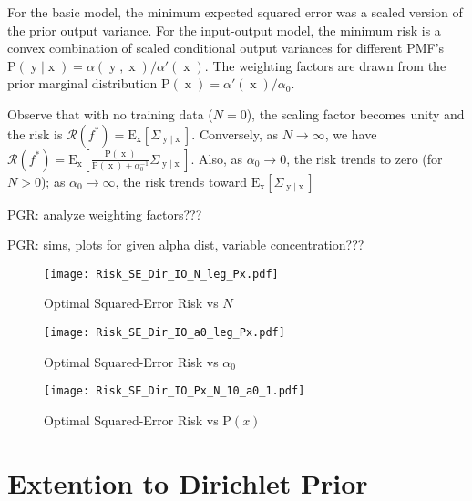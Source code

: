 \documentclass[12pt]{report}
\DeclareMathOperator{\xrm}{\mathrm{x}}
\DeclareMathOperator{\yrm}{\mathrm{y}}
\begin{document}
For the basic model, the minimum expected squared error was a scaled version of the prior output variance. For the input-output model, the minimum risk is a convex combination of scaled conditional output variances for different PMF's $\text{P}(\yrm | \xrm) = \alpha(\yrm,\xrm)/\alpha'(\xrm)$. The weighting factors are drawn from the prior marginal distribution $\text{P}(\xrm) = \alpha'(\xrm)/\alpha_0$.

Observe that with no training data ($N = 0$), the scaling factor becomes unity and the risk is $\mathcal{R}(f^*) = \text{E}_{\xrm} \left[ \Sigma_{\yrm | \xrm} \right]$. Conversely, as $N \to \infty$, we have $\mathcal{R}(f^*) = \text{E}_{\xrm} \left[ \frac{\text{P}(\xrm)}{\text{P}(\xrm) + \alpha_0^{-1}} \Sigma_{\yrm | \xrm} \right]$. Also, as $\alpha_0 \to 0$, the risk trends to zero (for $N > 0$); as $\alpha_0 \to \infty$, the risk trends toward $\text{E}_{\xrm} \left[ \Sigma_{\yrm | \xrm} \right]$



PGR: analyze weighting factors???

PGR: sims, plots for given alpha dist, variable concentration???


\begin{figure}
\centering
\texttt{[image: Risk\_SE\_Dir\_IO\_N\_leg\_Px.pdf]}
\caption{Optimal Squared-Error Risk vs $N$}
\label{fig:Risk_SE_Dir_IO_N_leg_Px}
\end{figure}

\begin{figure}
\centering
\texttt{[image: Risk\_SE\_Dir\_IO\_a0\_leg\_Px.pdf]}
\caption{Optimal Squared-Error Risk vs $\alpha_0$}
\label{fig:Risk_SE_Dir_IO_a0_leg_Px}
\end{figure}

\begin{figure}
\centering
\texttt{[image: Risk\_SE\_Dir\_IO\_Px\_N\_10\_a0\_1.pdf]}
\caption{Optimal Squared-Error Risk vs $\text{P}(x)$}
\label{fig:Risk_SE_Dir_IO_Px_N_10_a0_1}
\end{figure}















\chapter{Extention to Dirichlet Prior}
\end{document}
